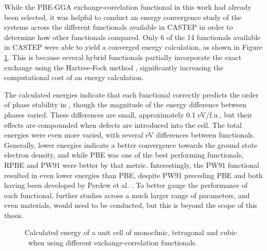 While the PBE-GGA exchange-correlation functional in this work had already been selected, it was helpful to conduct an energy convergence study of the systems across the different functionals available in CASTEP in order to determine how other functionals compared. Only 6 of the 14 functionals available in CASTEP were able to yield a converged energy calculation, as shown in Figure \ref{Figure:xc_test}. This is because several hybrid functionals partially incorporate the exact exchange using the Hartree-Fock method \cite{hartree1928wave}, significantly increasing the computational cost of an energy calculation. 

The calculated energies indicate that each functional correctly predicts the order of phase stability in \zirconia , though the magnitude of the energy difference between phases varied. These differences are small, approximately 0.1 eV/f.u., but their effects are compounded when defects are introduced into the cell. The total energies were even more varied, with several eV differences between functionals. Generally, lower energies indicate a better convergence towards the ground state electron density, and while PBE was one of the best performing functionals, RPBE and PW91 were better by that metric. Interestingly, the PW91 functional resulted in even lower energies than PBE, despite PW91 preceding PBE and both having been developed by Perdew et al. \cite{perdew1991unified, perdew1992atoms}. To better gauge the performance of each functional, further studies across a much larger range of parameters, and even materials, would need to be conducted, but this is beyond the scope of this thesis.

\begin{figure}[ht]
  \begin{center}
    \caption{Calculated energy of a unit cell of monoclinic, tetragonal and cubic \zirconia\ when using different exchange-correlation functionals.}
    \label{Figure:xc_test}
  \end{center}
\end{figure}

